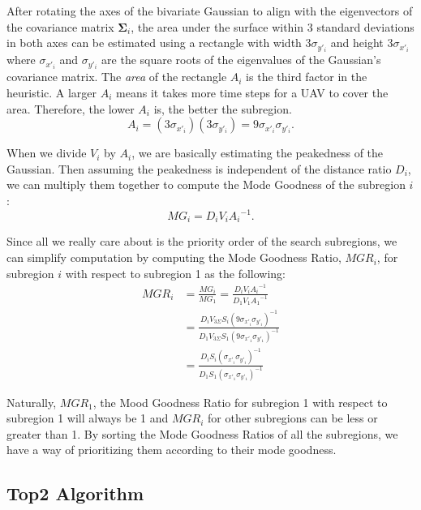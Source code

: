 \documentclass[journal]{IEEEtran}
\begin{document}
After rotating the axes of the bivariate Gaussian to align with the eigenvectors of the covariance matrix $\mathbf{\Sigma}_i$, the area under the surface within 3 standard deviations in both axes can be estimated using a rectangle with width $3\sigma_{y'_i}$ and height $3\sigma_{x'_i}$ where $\sigma_{x'_i}$ and $\sigma_{y'_i}$ are the square roots of the eigenvalues of the Gaussian's covariance matrix. The \textit{area} of the rectangle $A_i$ is the third factor in the heuristic. A larger $A_i$ means it takes more time steps for a UAV to cover the area. Therefore, the lower $A_i$ is, the better the subregion.
\begin{equation}
A_i = (3\sigma_{x'_i})(3\sigma_{y'_i}) = 9\sigma_{x'_i}\sigma_{y'_i}.
\label{Area}
\end{equation}

When we divide $V_i$ by $A_i$, we are basically estimating the peakedness of the Gaussian. Then assuming the peakedness is independent of the distance ratio $D_i$, we can multiply them together to compute the Mode Goodness of the subregion $i$:
\begin{equation}
MG_i = D_i V_i {A_i}^{-1}.
\label{Goodness}
\end{equation}

Since all we really care about is the priority order of the search subregions, we can simplify computation by computing the Mode Goodness Ratio, $\mathit{MGR}_i$, for subregion $i$ with respect to subregion 1 as the following:
\begin{align}
\mathit{MGR}_i &= \frac{MG_i}{MG_1} = \frac{D_i V_i {A_i}^{-1}}{D_1 V_1 {A_1}^{-1}} \\
&= \frac{D_i V_{3\Sigma} S_i (9\sigma_{x'_i}\sigma_{y'_i})^{-1}}{D_1 V_{3\Sigma} S_1 (9\sigma_{x'_1}\sigma_{y'_1})^{-1}} \\
&= \frac{D_i S_i (\sigma_{x'_i}\sigma_{y'_i})^{-1}}{D_1 S_1 (\sigma_{x'_1}\sigma_{y'_1})^{-1}}
\label{GoodnessRatio}
\end{align}

Naturally, $\mathit{MGR}_1$, the Mood Goodness Ratio for subregion 1 with respect to subregion 1 will always be 1 and $\mathit{MGR}_i$ for other subregions can be less or greater than 1. By sorting the Mode Goodness Ratios of all the subregions, we have a way of prioritizing them according to their mode goodness.


\subsection{Top2 Algorithm}
\end{document}

